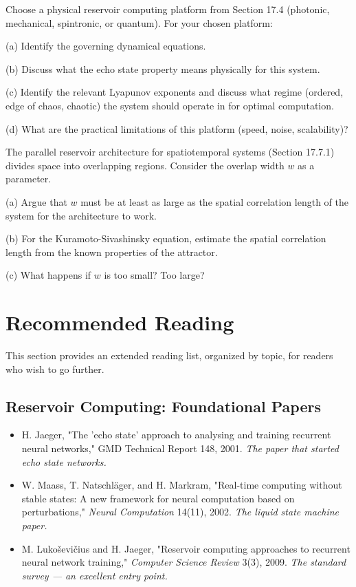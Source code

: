 \begin{exercise}
Choose a physical reservoir computing platform from Section 17.4 (photonic, mechanical, spintronic, or quantum). For your chosen platform:

(a) Identify the governing dynamical equations.

(b) Discuss what the echo state property means physically for this system.

(c) Identify the relevant Lyapunov exponents and discuss what regime (ordered, edge of chaos, chaotic) the system should operate in for optimal computation.

(d) What are the practical limitations of this platform (speed, noise, scalability)?
\end{exercise}


\begin{exercise}
The parallel reservoir architecture for spatiotemporal systems (Section 17.7.1) divides space into overlapping regions. Consider the overlap width $w$ as a parameter.

(a) Argue that $w$ must be at least as large as the spatial correlation length of the system for the architecture to work.

(b) For the Kuramoto-Sivashinsky equation, estimate the spatial correlation length from the known properties of the attractor.

(c) What happens if $w$ is too small? Too large?


\bigskip

\end{exercise}


\section*{Recommended Reading}

This section provides an extended reading list, organized by topic, for readers who wish to go further.

\subsection{Reservoir Computing: Foundational Papers}

\begin{itemize}[nosep]
  \item H. Jaeger, "The 'echo state' approach to analysing and training recurrent neural networks," GMD Technical Report 148, 2001. \textit{The paper that started echo state networks.}
  \item W. Maass, T. Natschläger, and H. Markram, "Real-time computing without stable states: A new framework for neural computation based on perturbations," \textit{Neural Computation} 14(11), 2002. \textit{The liquid state machine paper.}
  \item M. Lukoševičius and H. Jaeger, "Reservoir computing approaches to recurrent neural network training," \textit{Computer Science Review} 3(3), 2009. \textit{The standard survey --- an excellent entry point.}
\end{itemize}

